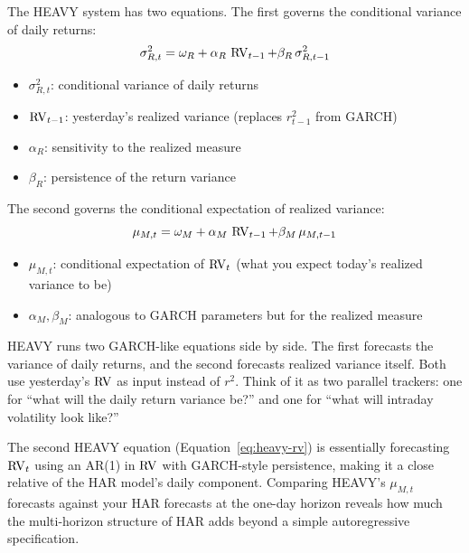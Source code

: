 The HEAVY system has two equations. The first governs the conditional variance of
daily returns:
%
\begin{equation}
\label{eq:heavy-return}
\sigma^2_{R,t} = \omega_R + \alpha_R \, \operatorname{RV}_{t-1} + \beta_R \, \sigma^2_{R,t-1}
\end{equation}
%
\begin{itemize}[nosep]
  \item $\sigma^2_{R,t}$: conditional variance of daily returns
  \item $\operatorname{RV}_{t-1}$: yesterday's realized variance (replaces $r^2_{t-1}$ from GARCH)
  \item $\alpha_R$: sensitivity to the realized measure
  \item $\beta_R$: persistence of the return variance
\end{itemize}

The second governs the conditional expectation of realized variance:
%
\begin{equation}
\label{eq:heavy-rv}
\mu_{M,t} = \omega_M + \alpha_M \, \operatorname{RV}_{t-1} + \beta_M \, \mu_{M,t-1}
\end{equation}
%
\begin{itemize}[nosep]
  \item $\mu_{M,t}$: conditional expectation of $\operatorname{RV}_t$ (what you expect today's
        realized variance to be)
  \item $\alpha_M, \beta_M$: analogous to GARCH parameters but for the realized
        measure
\end{itemize}

\begin{intuition}
HEAVY runs two GARCH-like equations side by side. The first forecasts the variance of
daily returns, and the second forecasts realized variance itself. Both use
yesterday's $\operatorname{RV}$ as input instead of $r^2$. Think of it as two parallel trackers:
one for ``what will the daily return variance be?'' and one for ``what will intraday
volatility look like?''
\end{intuition}

\begin{projectconnection}
The second HEAVY equation (Equation~\ref{eq:heavy-rv}) is essentially forecasting
$\operatorname{RV}_t$ using an AR(1) in $\operatorname{RV}$ with GARCH-style persistence, making it a
close relative of the HAR model's daily component. Comparing HEAVY's $\mu_{M,t}$
forecasts against your HAR forecasts at the one-day horizon reveals how much the
multi-horizon structure of HAR adds beyond a simple autoregressive specification.
\end{projectconnection}

